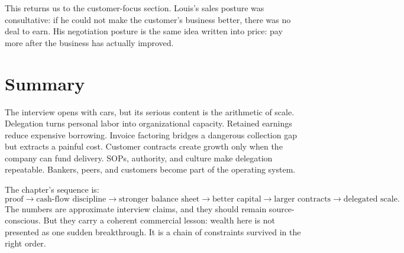This returns us to the customer-focus section. Louis's sales posture was consultative: if he could not make the customer's business better, there was no deal to earn. His negotiation posture is the same idea written into price: pay more after the business has actually improved.

\section{Summary}

The interview opens with cars, but its serious content is the arithmetic of scale. Delegation turns personal labor into organizational capacity. Retained earnings reduce expensive borrowing. Invoice factoring bridges a dangerous collection gap but extracts a painful cost. Customer contracts create growth only when the company can fund delivery. SOPs, authority, and culture make delegation repeatable. Bankers, peers, and customers become part of the operating system.

The chapter's sequence is:
\[
\text{proof}
\rightarrow
\text{cash-flow discipline}
\rightarrow
\text{stronger balance sheet}
\rightarrow
\text{better capital}
\rightarrow
\text{larger contracts}
\rightarrow
\text{delegated scale}.
\]
The numbers are approximate interview claims, and they should remain source-conscious. But they carry a coherent commercial lesson: wealth here is not presented as one sudden breakthrough. It is a chain of constraints survived in the right order.